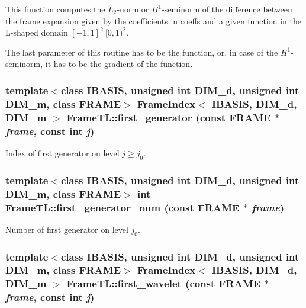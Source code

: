 This function computes the $L_2$-norm or $H^1$-seminorm of the difference between the frame expansion given by the coefficients in coeffs and a given function in the L-shaped domain $[-1,1]^2 \ [0,1)^2$. 

The last parameter of this routine has to be the function, or, in case of the $H^1$-seminorm, it has to be the gradient of the function. \hypertarget{namespaceFrameTL_6f69a38cdff114000317fd48750b471b}{
\subsubsection[first\_\-generator]{\setlength{\rightskip}{0pt plus 5cm}template$<$class IBASIS, unsigned int DIM\_\-d, unsigned int DIM\_\-m, class FRAME$>$ {\bf FrameIndex}$<$ IBASIS, DIM\_\-d, DIM\_\-m $>$ FrameTL::first\_\-generator (const FRAME $\ast$ {\em frame}, \/  const int {\em j})}}
\label{namespaceFrameTL_6f69a38cdff114000317fd48750b471b}


Index of first generator on level $j \geq j_0$. \hypertarget{namespaceFrameTL_80cab15b10b2b3bff9e29f51409f7ce7}{
\subsubsection[first\_\-generator\_\-num]{\setlength{\rightskip}{0pt plus 5cm}template$<$class IBASIS, unsigned int DIM\_\-d, unsigned int DIM\_\-m, class FRAME$>$ int FrameTL::first\_\-generator\_\-num (const FRAME $\ast$ {\em frame})}}
\label{namespaceFrameTL_80cab15b10b2b3bff9e29f51409f7ce7}


Number of first generator on level $j_0$. \hypertarget{namespaceFrameTL_ad2c37c6767c23fca5c2c3e1563680a5}{
\subsubsection[first\_\-wavelet]{\setlength{\rightskip}{0pt plus 5cm}template$<$class IBASIS, unsigned int DIM\_\-d, unsigned int DIM\_\-m, class FRAME$>$ {\bf FrameIndex}$<$ IBASIS, DIM\_\-d, DIM\_\-m $>$ FrameTL::first\_\-wavelet (const FRAME $\ast$ {\em frame}, \/  const int {\em j})}}
\label{namespaceFrameTL_ad2c37c6767c23fca5c2c3e1563680a5}


